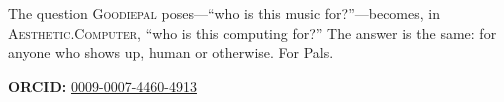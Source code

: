 \documentclass[10pt,letterpaper,twocolumn]{article}
\newcommand{\ac}{\textsc{Aesthetic.Computer}}
\newcommand{\gp}{\textsc{Goodiepal}}
\begin{document}
The question \gp{} poses---``who is this music for?''---becomes, in \ac{}, ``who is this computing for?'' The answer is the same: for anyone who shows up, human or otherwise. For Pals.

\vspace{0.5em}
\noindent\textbf{ORCID:} \href{https://orcid.org/0009-0007-4460-4913}{0009-0007-4460-4913}



\end{document}
